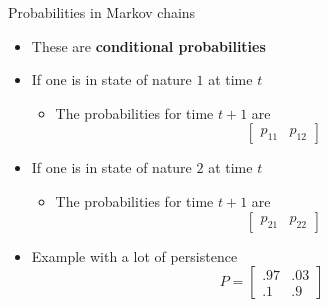 \documentclass[notes=show]{beamer}
\begin{document}
\begin{frame}%

Probabilities in Markov chains

\begin{itemize}
\item These are \textbf{conditional probabilities}

\item If one is in state of nature $1$ at time $t$

\begin{itemize}
\item The probabilities for time $t+1$ are 
\[
\left[ 
\begin{array}{cc}
p_{11} & p_{12}%
\end{array}%
\right] 
\]
\end{itemize}

\item If one is in state of nature $2$ at time $t$

\begin{itemize}
\item The probabilities for time $t+1$ are 
\[
\left[ 
\begin{array}{cc}
p_{21} & p_{22}%
\end{array}%
\right] 
\]
\end{itemize}

\item Example with a lot of persistence%
\[
P=\left[ 
\begin{array}{cc}
.97 & .03 \\ 
.1 & .9%
\end{array}%
\right] 
\]
\end{itemize}

\end{frame}%
\end{document}
